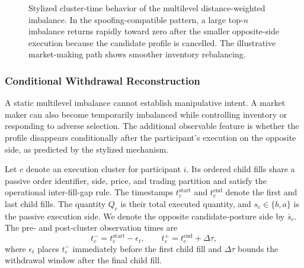 \documentclass[11pt]{article}
\begin{document}
\begin{figure}[htbp]
    \caption{Stylized cluster-time behavior of the multilevel distance-weighted imbalance. In the spoofing-compatible
    pattern, a large top-$n$ imbalance returns rapidly toward zero after the smaller opposite-side execution because the
    candidate profile is cancelled. The illustrative market-making path shows smoother inventory rebalancing.}
    \label{fig:topn_imbalance_dynamics}
\end{figure}
\FloatBarrier

\subsubsection{Conditional Withdrawal Reconstruction}
\label{subsec:multilevel_conditionality}

A static multilevel imbalance cannot establish manipulative intent. A market maker can also become temporarily imbalanced
while controlling inventory or responding to adverse selection. The additional observable feature is whether the profile
disappears conditionally after the participant's execution on the opposite side, as predicted by the stylized mechanism.

Let $c$ denote an execution cluster for participant $i$. Its ordered child fills share a passive order identifier, side,
price, and trading partition and satisfy the operational inter-fill-gap rule. The timestamps
$t_c^{\mathrm{start}}$ and $t_c^{\mathrm{end}}$ denote the first and last child fills. The quantity $Q_c$ is their total
executed quantity, and $s_c\in\{b,a\}$ is the passive execution side. We denote the opposite candidate-posture side by
$\bar{s}_c$. The pre- and post-cluster observation times are
\begin{equation}
    t_c^{-}=t_c^{\mathrm{start}}-\epsilon_t,
    \qquad
    t_c^{+}=t_c^{\mathrm{end}}+\Delta\tau,
\end{equation}
where $\epsilon_t$ places $t_c^{-}$ immediately before the first child fill and $\Delta\tau$ bounds the withdrawal window
after the final child fill.
\end{document}
